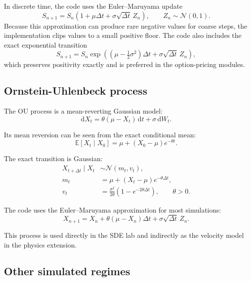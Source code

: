 \documentclass[11pt]{article}
\newcommand{\dd}{\mathrm{d}}
\newcommand{\E}{\mathbb{E}}
\newcommand{\N}{\mathcal{N}}
\begin{document}
In discrete time, the code uses the Euler--Maruyama update
\begin{equation}
  S_{n+1} = S_n\left(1 + \mu\Delta t + \sigma\sqrt{\Delta t}\,Z_n\right),
  \qquad Z_n \sim \N(0,1).
\end{equation}
Because this approximation can produce rare negative values for coarse steps, the implementation clips values to a small positive floor. The code also includes the exact exponential transition
\begin{equation}
  S_{n+1} = S_n\exp\left(\left(\mu - \tfrac{1}{2}\sigma^2\right)\Delta t + \sigma\sqrt{\Delta t}\,Z_n\right),
\end{equation}
which preserves positivity exactly and is preferred in the option-pricing modules.

\subsection{Ornstein-Uhlenbeck process}

The OU process is a mean-reverting Gaussian model:
\begin{equation}
  \dd X_t = \theta(\mu - X_t)\,\dd t + \sigma\,\dd W_t.
\end{equation}

Its mean reversion can be seen from the exact conditional mean:
\begin{equation}
  \E[X_t\mid X_0] = \mu + (X_0 - \mu)e^{-\theta t}.
\end{equation}

The exact transition is Gaussian:
\begin{align}
  X_{t+\Delta t}\mid X_t &\sim \N\left(m_t, v_t\right), \\
  m_t &= \mu + (X_t-\mu)e^{-\theta\Delta t}, \\
  v_t &= \frac{\sigma^2}{2\theta}\left(1-e^{-2\theta\Delta t}\right), \qquad \theta > 0.
\end{align}

The code uses the Euler--Maruyama approximation for most simulations:
\begin{equation}
  X_{n+1} = X_n + \theta(\mu - X_n)\Delta t + \sigma\sqrt{\Delta t}\,Z_n.
\end{equation}

This process is used directly in the SDE lab and indirectly as the velocity model in the physics extension.

\subsection{Other simulated regimes}
\end{document}

